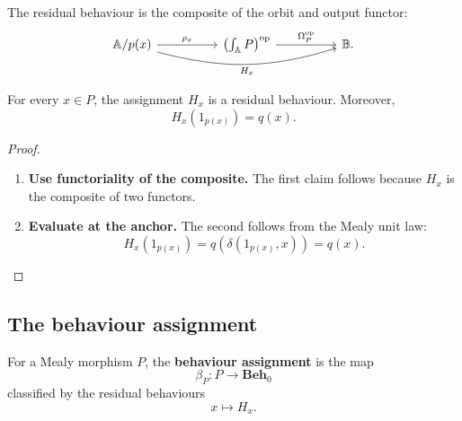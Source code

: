 The residual behaviour is the composite of the orbit and output functor:
\[
    \begin{tikzcd}[column sep=huge, row sep=large]
            \mathbb A/p(x)
                \arrow[r, "\rho_x"]
                \arrow[rr, "H_x"', bend right=16]
        &
            \left(\int_{\mathbb A}P\right)^{\mathrm{op}}
                \arrow[r, "\Omega_P^{\mathrm{op}}"]
        &
            \mathbb B.
    \end{tikzcd}
\]

\begin{proposition}
\label{prop:state-residual-behaviour-functor}
    For every \(x\in P\), the assignment \(H_x\) is a residual behaviour. Moreover,
    \[
        H_x(1_{p(x)})=q(x).
    \]
\end{proposition}
\begin{proof}
    \leavevmode
    \begin{enumerate}
        \item \textbf{Use functoriality of the composite.} The first claim follows because \(H_x\) is the composite of two functors.

        \item \textbf{Evaluate at the anchor.} The second follows from the Mealy unit law:
        \[
            H_x(1_{p(x)})
            =
            q(\delta(1_{p(x)},x))
            =
            q(x).
        \]
    \end{enumerate}
\end{proof}

\subsection{The behaviour assignment}
\label{subsec:semantic-map-beta}

\begin{definition}
\label{def:behaviour-assignment-map}
    For a Mealy morphism \(P\), the \textbf{behaviour assignment} is the map
    \[
        \beta_P:P\to\mathbf{Beh}_0
    \]
    classified by the residual behaviours
    \[
        x\longmapsto H_x.
    \]
\end{definition}

